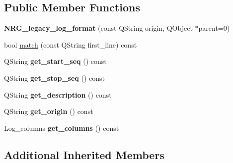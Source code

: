\subsection*{Public Member Functions}
\begin{DoxyCompactItemize}
\item 
\hypertarget{struct_log__viewer_1_1_n_r_g__legacy__log__format_a91653c6cc26f971003be1c442bdba465}{{\bfseries N\-R\-G\-\_\-legacy\-\_\-log\-\_\-format} (const Q\-String origin, Q\-Object $\ast$parent=0)}\label{struct_log__viewer_1_1_n_r_g__legacy__log__format_a91653c6cc26f971003be1c442bdba465}

\item 
bool \hyperlink{struct_log__viewer_1_1_n_r_g__legacy__log__format_a47061fc90c8b3bb06ee9599f13747442}{match} (const Q\-String first\-\_\-line) const 
\item 
\hypertarget{struct_log__viewer_1_1_n_r_g__legacy__log__format_a41fdb2fb07842f15b37e45b56c3ad88a}{Q\-String {\bfseries get\-\_\-start\-\_\-seq} () const }\label{struct_log__viewer_1_1_n_r_g__legacy__log__format_a41fdb2fb07842f15b37e45b56c3ad88a}

\item 
\hypertarget{struct_log__viewer_1_1_n_r_g__legacy__log__format_a829b88dca1607372247e95668fc9bb31}{Q\-String {\bfseries get\-\_\-stop\-\_\-seq} () const }\label{struct_log__viewer_1_1_n_r_g__legacy__log__format_a829b88dca1607372247e95668fc9bb31}

\item 
\hypertarget{struct_log__viewer_1_1_n_r_g__legacy__log__format_a697fbc75b7bcbdf0aea8433eb060f627}{Q\-String {\bfseries get\-\_\-description} () const }\label{struct_log__viewer_1_1_n_r_g__legacy__log__format_a697fbc75b7bcbdf0aea8433eb060f627}

\item 
\hypertarget{struct_log__viewer_1_1_n_r_g__legacy__log__format_a08649850c6b2fc380da04beb992d6e3a}{Q\-String {\bfseries get\-\_\-origin} () const }\label{struct_log__viewer_1_1_n_r_g__legacy__log__format_a08649850c6b2fc380da04beb992d6e3a}

\item 
\hypertarget{struct_log__viewer_1_1_n_r_g__legacy__log__format_ab8c3dc27076d4143ba112aec2d30ed5e}{Log\-\_\-columns {\bfseries get\-\_\-columns} () const }\label{struct_log__viewer_1_1_n_r_g__legacy__log__format_ab8c3dc27076d4143ba112aec2d30ed5e}

\end{DoxyCompactItemize}
\subsection*{Additional Inherited Members}


